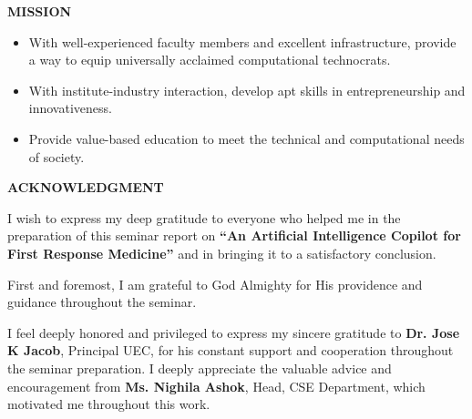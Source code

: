 \documentclass[12pt,a4paper]{report}
\begin{document}
\vspace{1.8cm}
\begin{center}
    {\fontsize{13pt}{16pt}\selectfont \textbf{MISSION}\par}
\end{center}

\vspace{0.4cm}
\begin{itemize}\setlength{\itemsep}{0.8em}
    \item With well-experienced faculty members and excellent infrastructure, provide a way to equip universally acclaimed computational technocrats.
    \item With institute-industry interaction, develop apt skills in entrepreneurship and innovativeness.
    \item Provide value-based education to meet the technical and computational needs of society.
\end{itemize}

\newpage
\pagestyle{frontmatterstyle}
\setcounter{page}{1}

\begin{center}
    {\fontsize{14pt}{17pt}\selectfont \textbf{ACKNOWLEDGMENT}\par}
\end{center}

\vspace{0.6cm}
\noindent
I wish to express my deep gratitude to everyone who helped me in the preparation of this seminar report on \textbf{``An Artificial Intelligence Copilot for First Response Medicine''} and in bringing it to a satisfactory conclusion.

\vspace{0.4cm}
\noindent
First and foremost, I am grateful to God Almighty for His providence and guidance throughout the seminar.

\vspace{0.4cm}
\noindent
I feel deeply honored and privileged to express my sincere gratitude to \textbf{Dr. Jose K Jacob}, Principal UEC, for his constant support and cooperation throughout the seminar preparation. I deeply appreciate the valuable advice and encouragement from \textbf{Ms. Nighila Ashok}, Head, CSE Department, which motivated me throughout this work.
\end{document}
